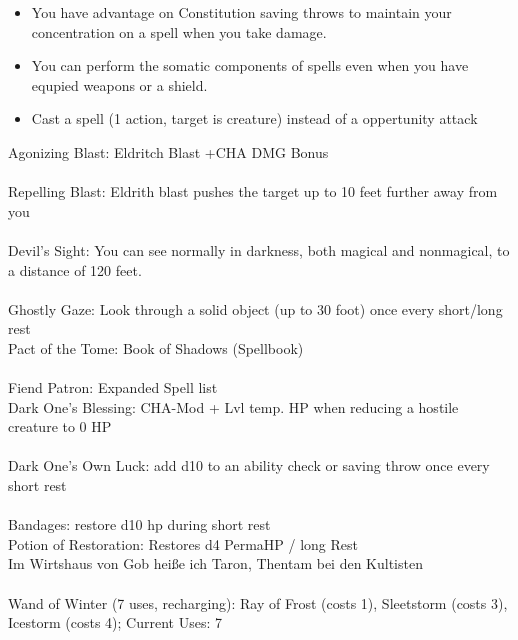 \documentclass[10pt,a4paper]{scrbook}
\begin{document}
{{\begin{itemize}
				\item You have advantage on Constitution saving throws to maintain your concentration on a spell when you take damage. 
				\item  You can perform the somatic components of spells even when you have equpied weapons or a shield. 
				\item Cast a spell (1 action, target is creature) instead of a oppertunity attack 
			\end{itemize} 
			Agonizing Blast: Eldritch Blast +CHA DMG Bonus \\%
			\\%
			Repelling Blast: Eldrith blast pushes the target up to 10 feet further away from you \\ 
			\\ 
			Devil’s Sight: You can see normally in darkness, both magical and nonmagical, to a distance of 120 feet. \\ 
			\\ 
			Ghostly Gaze: Look through a solid object (up to 30 foot) once every short/long rest 
			\\ 
			Pact of the Tome: Book of Shadows (Spellbook) \\ 
			\\ 
			Fiend Patron: Expanded Spell list \\ 
			Dark One's Blessing: CHA-Mod + Lvl temp. HP when reducing a hostile creature to 0 HP \\ 
			\\ 
			Dark One's Own Luck: add d10 to an ability check or saving throw once every short rest \\ 
			\\ 
			Bandages: restore d10 hp during short rest \\ 
			Potion of Restoration: Restores d4 PermaHP / long Rest 
			\\ 
			Im Wirtshaus von Gob heiße ich Taron, Thentam bei den Kultisten \\ 
			\\ 
			Wand of Winter (7 uses, recharging): Ray of Frost (costs 1), Sleetstorm (costs 3), Icestorm (costs 4); Current Uses: 7 
		} 
	}
\end{document}
